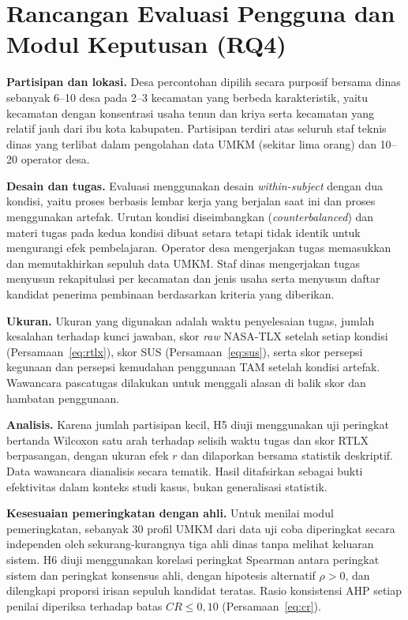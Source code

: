 \documentclass[12pt,a4paper]{report}
\begin{document}
\section{Rancangan Evaluasi Pengguna dan Modul Keputusan (RQ4)}
\label{sec:evalpengguna}

\textbf{Partisipan dan lokasi.} Desa percontohan dipilih secara purposif bersama dinas sebanyak 6--10 desa pada 2--3 kecamatan yang berbeda karakteristik, yaitu kecamatan dengan konsentrasi usaha tenun dan kriya serta kecamatan yang relatif jauh dari ibu kota kabupaten. Partisipan terdiri atas seluruh staf teknis dinas yang terlibat dalam pengolahan data UMKM (sekitar lima orang) dan 10--20 operator desa.

\textbf{Desain dan tugas.} Evaluasi menggunakan desain \textit{within-subject} dengan dua kondisi, yaitu proses berbasis lembar kerja yang berjalan saat ini dan proses menggunakan artefak. Urutan kondisi diseimbangkan (\textit{counterbalanced}) dan materi tugas pada kedua kondisi dibuat setara tetapi tidak identik untuk mengurangi efek pembelajaran. Operator desa mengerjakan tugas memasukkan dan memutakhirkan sepuluh data UMKM. Staf dinas mengerjakan tugas menyusun rekapitulasi per kecamatan dan jenis usaha serta menyusun daftar kandidat penerima pembinaan berdasarkan kriteria yang diberikan.

\textbf{Ukuran.} Ukuran yang digunakan adalah waktu penyelesaian tugas, jumlah kesalahan terhadap kunci jawaban, skor \textit{raw} NASA-TLX setelah setiap kondisi (Persamaan~\ref{eq:rtlx}), skor SUS (Persamaan~\ref{eq:sus}), serta skor persepsi kegunaan dan persepsi kemudahan penggunaan TAM setelah kondisi artefak. Wawancara pascatugas dilakukan untuk menggali alasan di balik skor dan hambatan penggunaan.

\textbf{Analisis.} Karena jumlah partisipan kecil, H5 diuji menggunakan uji peringkat bertanda Wilcoxon satu arah terhadap selisih waktu tugas dan skor RTLX berpasangan, dengan ukuran efek $r$ dan dilaporkan bersama statistik deskriptif. Data wawancara dianalisis secara tematik. Hasil ditafsirkan sebagai bukti efektivitas dalam konteks studi kasus, bukan generalisasi statistik.

\textbf{Kesesuaian pemeringkatan dengan ahli.} Untuk menilai modul pemeringkatan, sebanyak 30 profil UMKM dari data uji coba diperingkat secara independen oleh sekurang-kurangnya tiga ahli dinas tanpa melihat keluaran sistem. H6 diuji menggunakan korelasi peringkat Spearman antara peringkat sistem dan peringkat konsensus ahli, dengan hipotesis alternatif \(\rho > 0\), dan dilengkapi proporsi irisan sepuluh kandidat teratas. Rasio konsistensi AHP setiap penilai diperiksa terhadap batas $CR \leq 0{,}10$ (Persamaan~\ref{eq:cr}).
\end{document}
